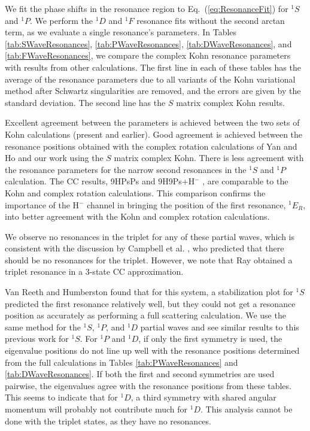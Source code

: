 \documentclass[preprint,showpacs,showkeys,preprintnumbers,amsmath,amssymb,longbibliography,pra,aps]{revtex4-1}
\begin{document}
We fit the phase shifts in the resonance region to Eq.~(\ref{eq:ResonanceFit})
for $^1S$ and $^1P$. We perform the $^1D$ and $^1F$ resonance fits without 
the second arctan term, as we evaluate a single resonance's parameters. In 
Tables \ref{tab:SWaveResonances}, \ref{tab:PWaveResonances},
\ref{tab:DWaveResonances}, and \ref{tab:FWaveResonances}, we compare the
complex Kohn resonance parameters with results from other calculations. The
first line in each of these tables has the average of the resonance parameters
due to all variants of the Kohn variational method after Schwartz singularities
are removed, and the errors are given by the standard deviation. The second 
line has the $S$ matrix complex Kohn results.

Excellent agreement between the parameters is achieved between the two sets 
of Kohn calculations (present and earlier). Good agreement is achieved 
between the resonance positions obtained with the complex rotation 
calculations of Yan and Ho \cite{Yan1999,Yan1998a,Ho1998,Ho2000} and our 
work using the $S$ matrix complex Kohn. There is less agreement with the
resonance parameters for the narrow second resonances in the $^1S$ and $^1P$
calculation. The CC results, 9HPsPs \cite{Blackwood2002} and
9H9Ps+H$^-$ \cite{Walters2004},
are comparable to the Kohn and complex rotation calculations. This 
comparison confirms the importance of the H$^-$ channel in bringing the 
position of the first resonance, $^1E_R$, into better agreement with the Kohn 
and complex rotation calculations.

We observe no resonances in the triplet for any of these partial waves, which 
is consistent with the discussion by Campbell et al. \cite{Campbell1998}, 
who predicted that there should be no resonances for the triplet.
However, we note that Ray \cite{Ray2006} obtained a triplet resonance in a
3-state CC approximation.

Van Reeth and Humberston \cite{VanReeth2004} found that for this 
system, a stabilization plot for $^1S$ predicted the first resonance 
relatively well, but they could not get a resonance position as accurately as 
performing a full scattering calculation. We use the same method for the $^1S$,
$^1P$, and $^1D$ partial waves and see similar results to this previous work 
for $^1S$. For $^1P$ and $^1D$, if only the first symmetry is used, the 
eigenvalue positions do not line up well with the resonance positions 
determined from the full calculations in Tables \ref{tab:PWaveResonances} and 
\ref{tab:DWaveResonances}. If both the first and second symmetries are used 
pairwise, the eigenvalues agree with the resonance positions from these 
tables. This seems to indicate that for $^1D$, a third symmetry with shared 
angular momentum will probably not contribute much for $^1D$. This analysis
cannot be done with the triplet states, as they have no resonances.
\end{document}
